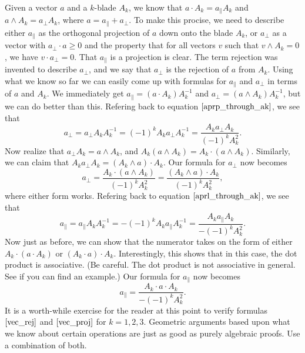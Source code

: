 \documentclass{article}
\newcommand{\prl}{\parallel}
\newcommand{\prp}{\perp}
\begin{document}
Given a vector $a$ and a $k$-blade
$A_k$, we know that $a\cdot A_k=a_{\prl}A_k$ and $a\wedge A_k=a_{\prp}A_k$,
where $a=a_{\prl}+a_{\prp}$.  To make this procise, we need to describe
either $a_{\prl}$ as the orthogonal projection of $a$ down onto the
blade $A_k$, or $a_{\prp}$ as a vector with $a_{\prp}\cdot a\geq 0$ and the property that
for all vectors $v$ such that $v\wedge A_k=0$, we have $v\cdot a_{\prp}=0$.  That
$a_{\prl}$ is a projection is clear.  The term rejection was invented to describe
$a_{\prp}$, and we say that $a_{\prp}$ is the rejection of $a$ from $A_k$.
Using what we know so far we can easily come up with formulas for $a_{\prl}$
and $a_{\prp}$ in terms of $a$ and $A_k$.  We immediately get $a_{\prl}=(a\cdot A_k)A_k^{-1}$
and $a_{\prp}=(a\wedge A_k)A_k^{-1}$, but we can do better than this.
Refering back to equation $\eqref{aprp_through_ak}$, we see that
\begin{equation*}
a_{\prp} = a_{\prp}A_kA_k^{-1} = (-1)^kA_ka_{\prp}A_k^{-1} = \frac{A_ka_{\prp}A_k}{(-1)^kA_k^2}.
\end{equation*}
Now realize that $a_{\prp}A_k=a\wedge A_k$, and $A_k(a\wedge A_k)=A_k\cdot(a\wedge A_k)$.
Similarly, we can claim that $A_ka_{\prp}A_k=(A_k\wedge a)\cdot A_k$.  Our formula
for $a_{\prp}$ now becomes
\begin{equation}\label{vec_rej}
a_{\prp} = \frac{A_k\cdot(a\wedge A_k)}{(-1)^kA_k^2} = \frac{(A_k\wedge a)\cdot A_k}{(-1)^kA_k^2},
\end{equation}
where either form works.  Refering back to equation $\eqref{aprl_through_ak}$, we see
that
\begin{equation*}
a_{\prl} = a_{\prl}A_kA_k^{-1} = -(-1)^kA_ka_{\prl}A_k^{-1} = \frac{A_ka_{\prl}A_k}{-(-1)^kA_k^2}.
\end{equation*}
Now just as before, we can show that the numerator takes on the form of either
$A_k\cdot(a\cdot A_k)$ or $(A_k\cdot a)\cdot A_k$.  Interestingly, this shows
that in this case, the dot product is associative.  (Be careful.  The dot product
is not associative in general.  See if you can find an example.)  Our formula
for $a_{\prl}$ now becomes
\begin{equation}\label{vec_proj}
a_{\prl} = \frac{A_k\cdot a\cdot A_k}{-(-1)^kA_k^2}.
\end{equation}
It is a worth-while exercise for the reader at this point to
verify formulas $\eqref{vec_rej}$ and $\eqref{vec_proj}$ for
$k=1,2,3$.  Geometric arguments based upon what we know about
certain operations are just as good as purely algebraic proofs.
Use a combination of both.
\end{document}
